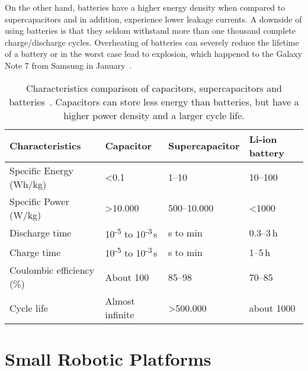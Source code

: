 On the other hand, batteries have a higher energy density when compared to supercapacitors and in addition, experience lower leakage currents.
A downside of using batteries is that they seldom withstand more than one thousand complete charge/discharge cycles.
Overheating of batteries can severely reduce the lifetime of a battery or in the worst case lead to explosion, which happened to the Galaxy Note 7 from Samsung in January~\cite{samsung_note7_2017}.



\begin{table}[t]
	\centering
	\caption{Characteristics comparison of capacitors, supercapacitors and batteries~\cite{Gonzalez_rser_2016}. Capacitors can store less energy than batteries, but have a higher power density and a larger cycle life.}
	\label{tab:cap_scap_battery}
	\small
	\begin{tabular}{|l||l|l|l|}
		\hline
		Characteristics & Capacitor & Supercapacitor & Li-ion battery \\
		\hline \hline
		Specific Energy (Wh/kg) & \textless 0.1 & 1--10 & 10--100 \\
		Specific Power (W/kg) & \textgreater 10.000 & 500--10.000 & \textless 1000 \\
		Discharge time & 10\textsuperscript{-5} to 10\textsuperscript{-3}\,s & s to min & 0.3--3\,h \\
		Charge time & 10\textsuperscript{-5} to 10\textsuperscript{-3}\,s & s to min & 1--5\,h \\
		Coulombic efficiency (\%) & About 100 & 85--98 & 70--85 \\
		Cycle life & Almost infinite & \textgreater 500.000 & about 1000 \\
		\hline
	\end{tabular}
\end{table}


\section{Small Robotic Platforms}
\label{sec:rw_robotic_platforms}

